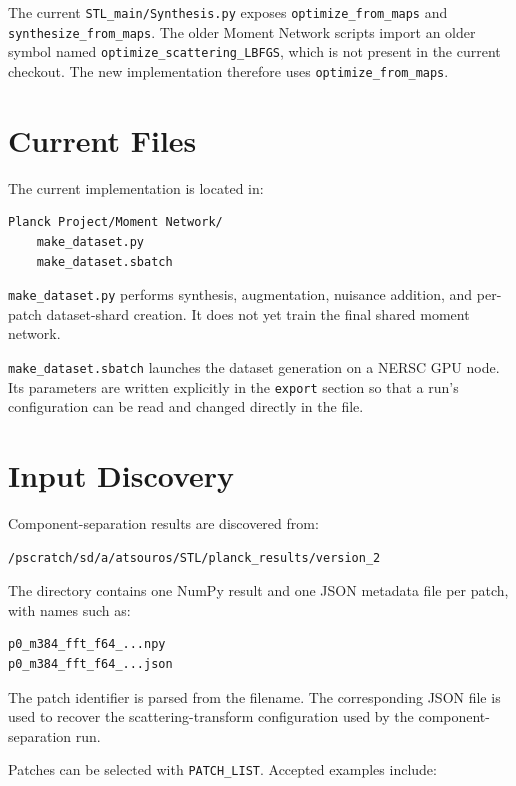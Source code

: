 \documentclass[11pt]{article}
\begin{document}
The current \texttt{STL\_main/Synthesis.py} exposes
\texttt{optimize\_from\_maps} and \texttt{synthesize\_from\_maps}.  The older
Moment Network scripts import an older symbol named
\texttt{optimize\_scattering\_LBFGS}, which is not present in the current
checkout.  The new implementation therefore uses
\texttt{optimize\_from\_maps}.

\section{Current Files}

The current implementation is located in:

\begin{lstlisting}
Planck Project/Moment Network/
    make_dataset.py
    make_dataset.sbatch
\end{lstlisting}

\texttt{make\_dataset.py} performs synthesis, augmentation, nuisance addition,
and per-patch dataset-shard creation.  It does not yet train the final shared
moment network.

\texttt{make\_dataset.sbatch} launches the dataset generation on a NERSC GPU
node.  Its parameters are written explicitly in the \texttt{export} section so
that a run's configuration can be read and changed directly in the file.

\section{Input Discovery}

Component-separation results are discovered from:

\begin{lstlisting}
/pscratch/sd/a/atsouros/STL/planck_results/version_2
\end{lstlisting}

The directory contains one NumPy result and one JSON metadata file per patch,
with names such as:

\begin{lstlisting}
p0_m384_fft_f64_...npy
p0_m384_fft_f64_...json
\end{lstlisting}

The patch identifier is parsed from the filename.  The corresponding JSON file
is used to recover the scattering-transform configuration used by the
component-separation run.

Patches can be selected with \texttt{PATCH\_LIST}.  Accepted examples include:
\end{document}

